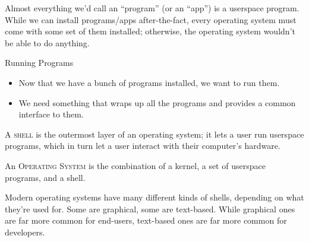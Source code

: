 Almost everything we'd call an ``program'' (or an ``app'') is a userspace
program.  While we can install programs/apps after-the-fact, every operating
system must come with some set of them installed; otherwise, the operating
system wouldn't be able to do anything.

\begin{frame}{Running Programs}
  \begin{itemize}
    \item
      Now that we have a bunch of programs installed, we want to run them.\pause
    \item
      We need something that wraps up all the programs and provides a common
      interface to them.\pause
  \end{itemize}
  \begin{definition}[shell]
    A \textsc{shell} is the outermost layer of an operating system; it lets a
    user run userspace programs, which in turn let a user interact with their
    computer's hardware.
  \end{definition}
  \pause
  \begin{definition}
    An \textsc{Operating System} is the combination of a kernel, a set of
    userspace programs, and a shell.
  \end{definition}
\end{frame}

Modern operating systems have many different kinds of shells, depending on what
they're used for.  Some are graphical, some are text-based.  While graphical
ones are far more common for end-users, text-based ones are far more common for
developers.

